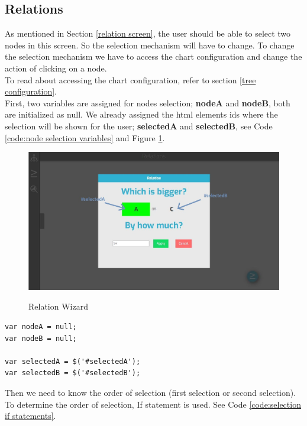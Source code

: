 \documentclass[11pt]{article} %
\begin{document}
\subsection{Relations}
As mentioned in Section \ref{relation screen}, the user should be able to select two nodes in this screen. So the selection mechanism will have to change. To change the selection mechanism we have to access the chart configuration and change the action of clicking on a node.\\
To read about accessing the chart configuration, refer to section \ref{tree configuration}.\\
First, two variables are assigned for nodes selection; \textbf{nodeA} and \textbf{nodeB}, both are initialized as null. We already assigned the html elements ids where the selection will be shown for the user; \textbf{selectedA} and \textbf{selectedB}, see Code \ref{code:node selection variables} and Figure \ref{screenshot:relation selection}.

\begin{figure}[h!]
  \caption{Relation Wizard}
  \centering
  \includegraphics[width=\textwidth]{relationSelectionMechanism}
  \label{screenshot:relation selection}
\end{figure}

\noindent
\begin{minipage}[c]{\linewidth}
\begin{lstlisting}[basicstyle=\scriptsize, tabsize=4, frame=single, caption=Node Selection Variables, label=code:node selection variables]
var nodeA = null;
var nodeB = null;

var selectedA = $('#selectedA');
var selectedB = $('#selectedB');
\end{lstlisting}
\end{minipage}

\noindent
Then we need to know the order of selection (first selection or second selection). To determine the order of selection, If statement is used. See Code \ref{code:selection if statements}.
\end{document}
